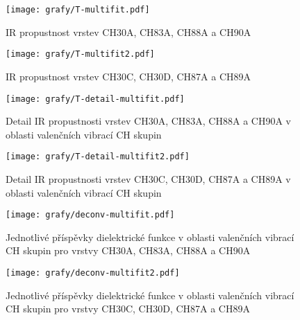 \begin{figure}[ht]
	\texttt{[image: grafy/T-multifit.pdf]}
	\caption{IR propustnost vrstev CH30A, CH83A, CH88A a CH90A}
	\label{T-multifit}
\end{figure}

\begin{figure}[ht]
	\texttt{[image: grafy/T-multifit2.pdf]}
	\caption{IR propustnost vrstev CH30C, CH30D, CH87A a CH89A}
	\label{T-multifit2}
\end{figure}

\begin{figure}[ht]
	\texttt{[image: grafy/T-detail-multifit.pdf]}
	\caption{Detail IR propustnosti vrstev CH30A, CH83A, CH88A a CH90A v oblasti valenčních vibrací CH skupin}
	\label{T-detail}
\end{figure}

\begin{figure}[ht]
	\texttt{[image: grafy/T-detail-multifit2.pdf]}
	\caption{Detail IR propustnosti vrstev CH30C, CH30D, CH87A a CH89A v oblasti valenčních vibrací CH skupin}
	\label{T-detail2}
\end{figure}

\begin{figure}[ht]
	\texttt{[image: grafy/deconv-multifit.pdf]}
	\caption{Jednotlivé příspěvky dielektrické funkce v oblasti valenčních vibrací CH skupin pro vrstvy CH30A, CH83A, CH88A a CH90A}
	\label{deconvolute}
\end{figure}

\begin{figure}[ht]
	\texttt{[image: grafy/deconv-multifit2.pdf]}
	\caption{Jednotlivé příspěvky dielektrické funkce v oblasti valenčních vibrací CH skupin pro vrstvy CH30C, CH30D, CH87A a CH89A}
	\label{deconvolute2}
\end{figure}

\cleardoublepage
